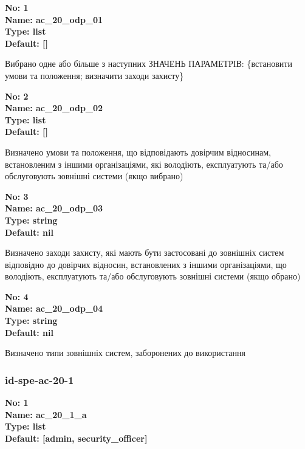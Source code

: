 \documentclass{article}
\begin{document}
\vspace{10pt}
{\footnotesize\bfseries
No: 1\\
Name: ac\_\allowbreak{}20\_\allowbreak{}odp\_\allowbreak{}01\\
Type: list\\
Default: []
}

{\footnotesize Вибрано одне або більше з наступних ЗНАЧЕНЬ ПАРАМЕТРІВ: \{встановити умови та положення; визначити заходи захисту\}}


{\footnotesize\bfseries
No: 2\\
Name: ac\_\allowbreak{}20\_\allowbreak{}odp\_\allowbreak{}02\\
Type: list\\
Default: []
}

{\footnotesize Визначено умови та положення, що відповідають довірчим відносинам, встановленим з іншими організаціями, які володіють, експлуатують та/або обслуговують зовнішні системи (якщо вибрано)}


{\footnotesize\bfseries
No: 3\\
Name: ac\_\allowbreak{}20\_\allowbreak{}odp\_\allowbreak{}03\\
Type: string\\
Default: nil
}

{\footnotesize Визначено заходи захисту, які мають бути застосовані до зовнішніх систем відповідно до довірчих відносин, встановлених з іншими організаціями, що володіють, експлуатують та/або обслуговують зовнішні системи (якщо обрано)}


{\footnotesize\bfseries
No: 4\\
Name: ac\_\allowbreak{}20\_\allowbreak{}odp\_\allowbreak{}04\\
Type: string\\
Default: nil
}

{\footnotesize Визначено типи зовнішніх систем, заборонених до використання}




\subsubsection{id-spe-ac-20-1}


\vspace{10pt}
{\footnotesize\bfseries
No: 1\\
Name: ac\_\allowbreak{}20\_\allowbreak{}1\_\allowbreak{}a\\
Type: list\\
Default: [\textquotedbl{}admin\textquotedbl{}, \textquotedbl{}security\_\allowbreak{}officer\textquotedbl{}]
}
\end{document}
